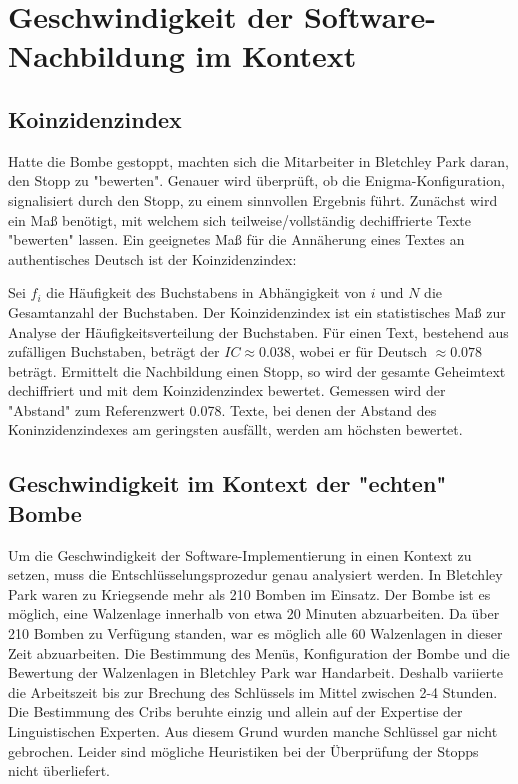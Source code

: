 \chapter{Geschwindigkeit der Software-Nachbildung im Kontext}\label{ch:speed}

\section{Koinzidenzindex}\label{sec:koinzidenzindex}
Hatte die Bombe gestoppt, machten sich die Mitarbeiter in Bletchley Park daran, den Stopp zu "bewerten". 
Genauer wird überprüft, ob die Enigma-Konfiguration, signalisiert durch den Stopp, zu einem sinnvollen Ergebnis führt.
Zunächst wird ein Maß benötigt, mit welchem sich teilweise/vollständig dechiffrierte Texte "bewerten" lassen.
Ein geeignetes Maß für die Annäherung eines Textes an authentisches Deutsch ist der Koinzidenzindex:

	
	
Sei $f_i$ die Häufigkeit des Buchstabens in Abhängigkeit von $i$ und $N$ die Gesamtanzahl der Buchstaben.
Der Koinzidenzindex ist ein statistisches Maß zur Analyse der Häufigkeitsverteilung der Buchstaben.
Für einen Text, bestehend aus zufälligen Buchstaben, beträgt der $IC \approx 0.038$, wobei er für Deutsch $\approx 0.078$ beträgt.
Ermittelt die Nachbildung einen Stopp, so wird der gesamte Geheimtext dechiffriert und mit dem Koinzidenzindex bewertet.
Gemessen wird der "Abstand" zum Referenzwert 0.078.
Texte, bei denen der Abstand des Koninzidenzindexes am geringsten ausfällt, werden am höchsten bewertet.


\section{Geschwindigkeit im Kontext der "echten" Bombe}\label{sec:speed}
Um die Geschwindigkeit der Software-Implementierung in einen Kontext zu setzen, muss die Entschlüsselungsprozedur genau analysiert werden.
In Bletchley Park waren zu Kriegsende mehr als 210 Bomben im Einsatz.
Der Bombe ist es möglich, eine Walzenlage innerhalb von etwa 20 Minuten abzuarbeiten.
Da über 210 Bomben zu Verfügung standen, war es möglich alle 60 Walzenlagen in dieser Zeit abzuarbeiten.
Die Bestimmung des Menüs, Konfiguration der Bombe und die Bewertung der Walzenlagen in Bletchley Park war Handarbeit.
Deshalb variierte die Arbeitszeit bis zur Brechung des Schlüssels im Mittel zwischen 2-4 Stunden.
Die Bestimmung des Cribs beruhte einzig und allein auf der Expertise der Linguistischen Experten. 
Aus diesem Grund wurden manche Schlüssel gar nicht gebrochen.
Leider sind mögliche Heuristiken bei der Überprüfung der Stopps nicht überliefert.

